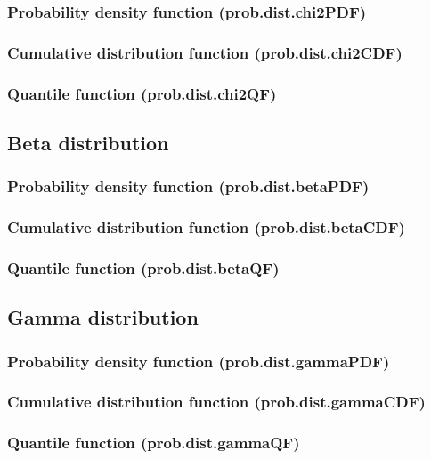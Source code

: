 \documentclass{article}
\theoremstyle{definition}
\begin{document}
\subsubsection{Probability density function (prob.dist.chi2PDF)}
\subsubsection{Cumulative distribution function (prob.dist.chi2CDF)}
\subsubsection{Quantile function (prob.dist.chi2QF)}

\subsection{Beta distribution}
\subsubsection{Probability density function (prob.dist.betaPDF)}
\subsubsection{Cumulative distribution function (prob.dist.betaCDF)}
\subsubsection{Quantile function (prob.dist.betaQF)}

\subsection{Gamma distribution}
\subsubsection{Probability density function (prob.dist.gammaPDF)}
\subsubsection{Cumulative distribution function (prob.dist.gammaCDF)}
\subsubsection{Quantile function (prob.dist.gammaQF)}
\end{document}
